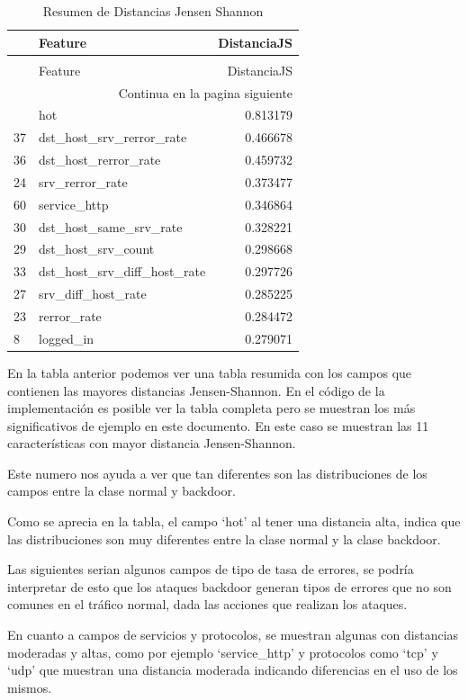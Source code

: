 \documentclass[12pt,a4paper]{article}
\begin{document}
\begin{longtable}{llr}
  \caption{Resumen de Distancias Jensen Shannon} \\
  \toprule
  & Feature & DistanciaJS \\
  \midrule
  \endfirsthead
  \caption[]{Resumen de Distancias Jensen Shannon} \\
  \toprule
  & Feature & DistanciaJS \\
  \midrule
  \endhead
  \midrule
  \multicolumn{3}{r}{Continua en la pagina siguiente} \\
  \midrule
  \endfoot
  \bottomrule
  \endlastfoot
  6 & hot & 0.813179 \\
  37 & dst_host_srv_rerror_rate & 0.466678 \\
  36 & dst_host_rerror_rate & 0.459732 \\
  24 & srv_rerror_rate & 0.373477 \\
  60 & service_http & 0.346864 \\
  30 & dst_host_same_srv_rate & 0.328221 \\
  29 & dst_host_srv_count & 0.298668 \\
  33 & dst_host_srv_diff_host_rate & 0.297726 \\
  27 & srv_diff_host_rate & 0.285225 \\
  23 & rerror_rate & 0.284472 \\
  8 & logged_in & 0.279071 \\
\end{longtable}

En la tabla anterior podemos ver una tabla resumida con los campos que contienen las mayores distancias Jensen-Shannon.
En el código de la implementación es posible ver la tabla completa pero se muestran los más significativos de ejemplo en este documento.
En este caso se muestran las 11 características con mayor distancia Jensen-Shannon.

Este numero nos ayuda a ver que tan diferentes son las distribuciones de los campos entre la clase normal y backdoor.

Como se aprecia en la tabla, el campo `hot' al tener una distancia alta, indica que las distribuciones son
muy diferentes entre la clase normal y la clase backdoor.

Las siguientes serian algunos campos de tipo de tasa de errores, se podría interpretar de esto que los ataques backdoor
generan tipos de errores que no son comunes en el tráfico normal, dada las acciones que realizan los ataques.

En cuanto a campos de servicios y protocolos, se muestran algunas con distancias moderadas y altas, como por ejemplo
`service_http' y protocolos como `tcp' y `udp' que muestran una distancia moderada indicando diferencias en el uso de los mismos.
\end{document}
